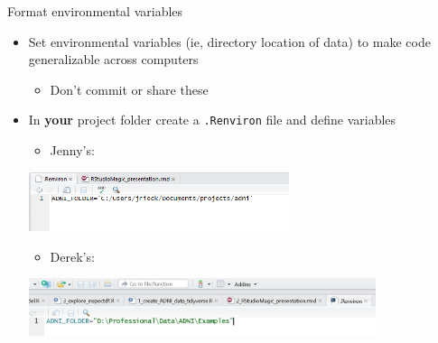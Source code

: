 \documentclass[ignorenonframetext,]{beamer}
\providecommand{\tightlist}{%
  \setlength{\itemsep}{0pt}\setlength{\parskip}{0pt}}
\begin{document}
\begin{frame}[fragile]{Format environmental variables}
\protect\hypertarget{format-environmental-variables}{}

\begin{itemize}
\tightlist
\item
  Set environmental variables (ie, directory location of data) to make
  code generalizable across computers

  \begin{itemize}
  \tightlist
  \item
    Don't commit or share these
  \end{itemize}
\item
  In \textbf{your} project folder create a \texttt{.Renviron} file and
  define variables

  \begin{itemize}
  \tightlist
  \item
    Jenny's:
  \end{itemize}

  \includegraphics[width=0.6\textwidth,height=\textheight]{../external/images/setup_3_rstudio_project_environ.PNG}

  \begin{itemize}
  \tightlist
  \item
    Derek's:
  \end{itemize}

  \includegraphics[width=0.8\textwidth,height=\textheight]{../external/images/setup_3_rstudio_project_environ2.PNG}
\end{itemize}

\end{frame}
\end{document}
